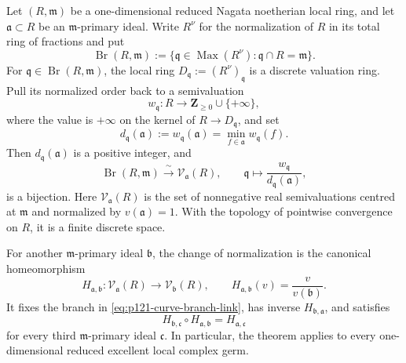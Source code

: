 \begin{theorem}
\label{thm:p121-reduced-nagata-curve-link}
Let \((R,\mathfrak m)\) be a one-dimensional reduced Nagata noetherian
local ring, and let \(\mathfrak a\subset R\) be an
\(\mathfrak m\)-primary ideal.  Write \(R^\nu\) for the normalization of
\(R\) in its total ring of fractions and put
\[
 \operatorname{Br}(R,\mathfrak m)
 :=\{\mathfrak q\in\operatorname{Max}(R^\nu):
                         \mathfrak q\cap R=\mathfrak m\}.
\]
For \(\mathfrak q\in\operatorname{Br}(R,\mathfrak m)\), the local ring
\(D_{\mathfrak q}:=(R^\nu)_{\mathfrak q}\) is a discrete valuation
ring.  Pull its normalized order back to a semivaluation
\[
 w_{\mathfrak q}:R\longrightarrow
                    \mathbf Z_{\geq0}\cup\{+\infty\},
\]
where the value is \(+\infty\) on the kernel of
\(R\to D_{\mathfrak q}\), and set
\[
 d_{\mathfrak q}(\mathfrak a)
 :=w_{\mathfrak q}(\mathfrak a)
 =\min_{f\in\mathfrak a}w_{\mathfrak q}(f).
\]
Then \(d_{\mathfrak q}(\mathfrak a)\) is a positive integer, and
\[
 \operatorname{Br}(R,\mathfrak m)\xrightarrow{\ \sim\ }
 \mathcal V_{\mathfrak a}(R),
 \qquad
 \mathfrak q\longmapsto
       \frac{w_{\mathfrak q}}{d_{\mathfrak q}(\mathfrak a)},
 \tag{\(\star\)}\label{eq:p121-curve-branch-link}
\]
is a bijection.  Here \(\mathcal V_{\mathfrak a}(R)\) is the set of
nonnegative real semivaluations centred at \(\mathfrak m\) and normalized
by \(v(\mathfrak a)=1\).  With the topology of pointwise convergence on
\(R\), it is a finite discrete space.

For another \(\mathfrak m\)-primary ideal \(\mathfrak b\), the change of
normalization is the canonical homeomorphism
\[
 H_{\mathfrak a,\mathfrak b}:\mathcal V_{\mathfrak a}(R)
       \longrightarrow\mathcal V_{\mathfrak b}(R),
 \qquad
 H_{\mathfrak a,\mathfrak b}(v)=\frac{v}{v(\mathfrak b)}.
 \tag{\(\dagger\)}\label{eq:p121-change-normalizing-ideal}
\]
It fixes the branch in \eqref{eq:p121-curve-branch-link}, has inverse
\(H_{\mathfrak b,\mathfrak a}\), and satisfies
\[
 H_{\mathfrak b,\mathfrak c}\circ H_{\mathfrak a,\mathfrak b}
       =H_{\mathfrak a,\mathfrak c}
\]
for every third \(\mathfrak m\)-primary ideal \(\mathfrak c\).
In particular, the theorem applies to every one-dimensional reduced
excellent local complex germ.
\end{theorem}
